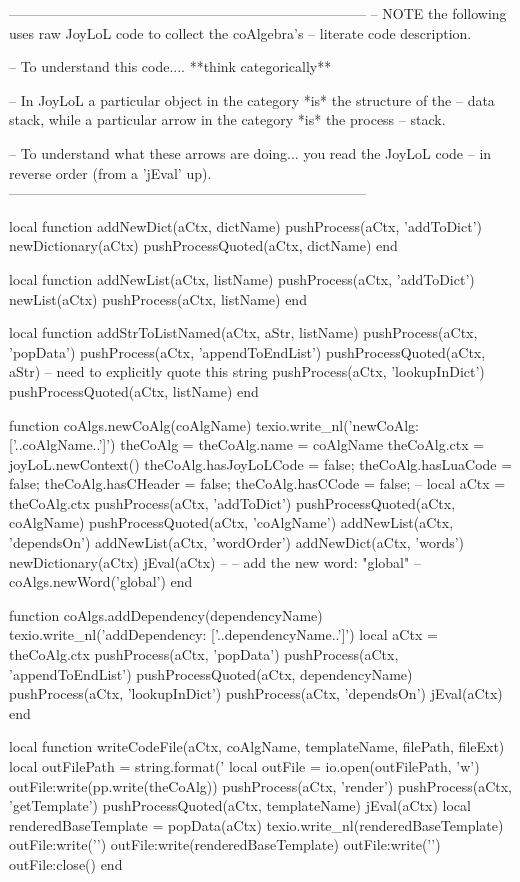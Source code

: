 -----------------------------------------------------------------------------
-- NOTE the following uses raw JoyLoL code to collect the coAlgebra's 
-- literate code description.

-- To understand this code.... **think categorically**

-- In JoyLoL a particular object in the category *is* the structure of the 
-- data stack, while a particular arrow in the category *is* the process 
-- stack.

-- To understand what these arrows are doing... you read the JoyLoL code 
-- in reverse order (from a 'jEval' up). 
-----------------------------------------------------------------------------

local function addNewDict(aCtx, dictName)
  pushProcess(aCtx, 'addToDict')
  newDictionary(aCtx)
  pushProcessQuoted(aCtx, dictName)
end

local function addNewList(aCtx, listName)
  pushProcess(aCtx, 'addToDict')
  newList(aCtx)
  pushProcess(aCtx, listName)
end

local function addStrToListNamed(aCtx, aStr, listName)
  pushProcess(aCtx, 'popData')
  pushProcess(aCtx, 'appendToEndList')
  pushProcessQuoted(aCtx, aStr) -- need to explicitly quote this string
  pushProcess(aCtx, 'lookupInDict')
  pushProcessQuoted(aCtx, listName)
end

function coAlgs.newCoAlg(coAlgName)
  texio.write_nl('newCoAlg: ['..coAlgName..']')
  theCoAlg               = {}
  theCoAlg.name          = coAlgName
  theCoAlg.ctx           = joyLoL.newContext()
  theCoAlg.hasJoyLoLCode = false;
  theCoAlg.hasLuaCode    = false;
  theCoAlg.hasCHeader    = false;
  theCoAlg.hasCCode      = false;
  -- 
  local aCtx = theCoAlg.ctx
  pushProcess(aCtx, 'addToDict')
  pushProcessQuoted(aCtx, coAlgName)
  pushProcessQuoted(aCtx, 'coAlgName')
  addNewList(aCtx, 'dependsOn')
  addNewList(aCtx, 'wordOrder')
  addNewDict(aCtx, 'words')
  newDictionary(aCtx)
  jEval(aCtx)
  --
  -- add the new word: "global"
  --
  coAlgs.newWord('global')
end

function coAlgs.addDependency(dependencyName)
  texio.write_nl('addDependency: ['..dependencyName..']')
  local aCtx = theCoAlg.ctx
  pushProcess(aCtx, 'popData')
  pushProcess(aCtx, 'appendToEndList')
  pushProcessQuoted(aCtx, dependencyName)
  pushProcess(aCtx, 'lookupInDict')
  pushProcess(aCtx, 'dependsOn')
  jEval(aCtx)
end

local function writeCodeFile(aCtx, coAlgName, templateName, filePath, fileExt)
  local outFilePath = string.format('%
  local outFile = io.open(outFilePath, 'w')
  outFile:write(pp.write(theCoAlg))
  pushProcess(aCtx, 'render')
  pushProcess(aCtx, 'getTemplate')
  pushProcessQuoted(aCtx, templateName)
  jEval(aCtx)
  local renderedBaseTemplate = popData(aCtx)
  texio.write_nl(renderedBaseTemplate)
  outFile:write('\n')
  outFile:write(renderedBaseTemplate)
  outFile:write('\n')
  outFile:close()
end

